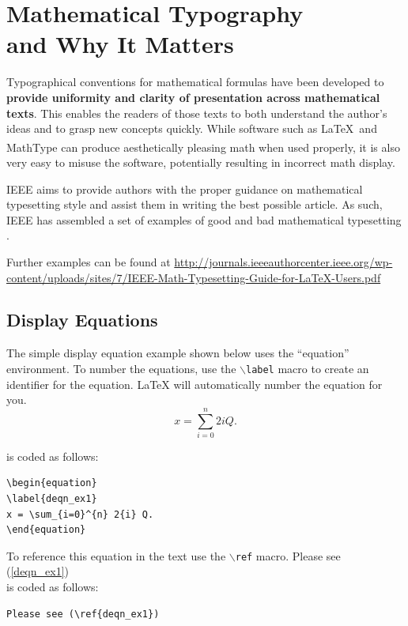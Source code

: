 \documentclass[lettersize,journal]{IEEEtran}
\begin{document}
\section{Mathematical Typography \\ and Why It Matters}

Typographical conventions for mathematical formulas have been developed to {\bf provide uniformity and clarity of presentation across mathematical texts}. This enables the readers of those texts to both understand the author's ideas and to grasp new concepts quickly. While software such as \LaTeX \ and MathType\textsuperscript{\textregistered} can produce aesthetically pleasing math when used properly, it is also very easy to misuse the software, potentially resulting in incorrect math display.

IEEE aims to provide authors with the proper guidance on mathematical typesetting style and assist them in writing the best possible article. As such, IEEE has assembled a set of examples of good and bad mathematical typesetting \cite{ref1,ref2,ref3,ref4,ref5}.

Further examples can be found at \url{http://journals.ieeeauthorcenter.ieee.org/wp-content/uploads/sites/7/IEEE-Math-Typesetting-Guide-for-LaTeX-Users.pdf}

\subsection{Display Equations}
The simple display equation example shown below uses the ``equation'' environment. To number the equations, use the $\backslash${\tt{label}} macro to create an identifier for the equation. LaTeX will automatically number the equation for you.
\begin{equation}
\label{deqn_ex1}
x = \sum_{i=0}^{n} 2{i} Q.
\end{equation}

\noindent is coded as follows:
\begin{verbatim}
\begin{equation}
\label{deqn_ex1}
x = \sum_{i=0}^{n} 2{i} Q.
\end{equation}
\end{verbatim}

To reference this equation in the text use the $\backslash${\tt{ref}} macro.
Please see (\ref{deqn_ex1})\\
\noindent is coded as follows:
\begin{verbatim}
Please see (\ref{deqn_ex1})\end{verbatim}
\end{document}
